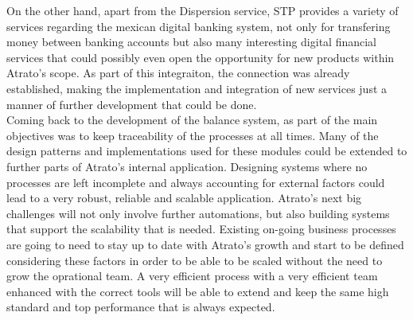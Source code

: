 On the other hand, apart from the Dispersion service, STP provides a variety of services regarding the mexican digital banking system, not only for transfering money between banking accounts but also many interesting digital financial services that could possibly even open the opportunity for new products within Atrato's scope. As part of this integraiton, the connection was already established, making the implementation and integration of new services just a manner of further development that could be done.\\

Coming back to the development of the balance system, as part of the main objectives was to keep traceability of the processes at all times. Many of the design patterns and implementations used for these modules could be extended to further parts of Atrato's internal application. Designing systems where no processes are left incomplete and always accounting for external factors could lead to a very robust, reliable and scalable application. Atrato's next big challenges will not only involve further automations, but also building systems that support the scalability that is needed. Existing on-going business processes are going to need to stay up to date with Atrato's growth and start to be defined considering these factors in order to be able to be scaled without the need to grow the oprational team. A very efficient process with a very efficient team enhanced with the correct tools will be able to extend and keep the same high standard and top performance that is always expected.
